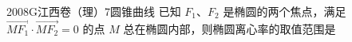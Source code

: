 
\begin{problem}{2008}{G}{江西卷（理）}{7}{圆锥曲线}
已知 $ F_1 $、$ F_2 $ 是椭圆的两个焦点，满足 $ \overrightarrow{MF_1} \cdot \overrightarrow{MF_2} = 0 $ 的点 $ M $ 总在椭圆内部，则椭圆离心率的取值范围是
\begin{choices}
\choice{{$\left( 0, \dfrac{1}{2} \right]$}}
\choice{{$\left[ \dfrac{\sqrt{2}}{2}, 1 \right)$}}
\end{choices}
\end{problem}

\begin{answer}

\end{answer}

\begin{solutions}

\end{solutions}